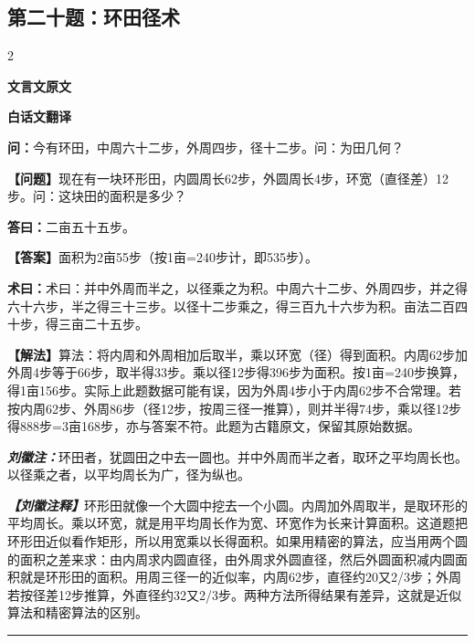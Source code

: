 \documentclass[10pt,a4paper]{article}
\newcommand{\wen}[1]{\textbf{\color{problemcolor}问：}#1\par}
\newcommand{\da}[1]{\textbf{答曰：}#1\par}
\newcommand{\shu}[1]{\textbf{术曰：}#1\par}
\newcommand{\liuhui}[1]{{\color{commentarycolor}\textit{\textbf{刘徽注：}}#1\par}}
\newcommand{\classicalheader}[1]{{\centering\large\bfseries\color{classicalcolor} #1\par\vspace{0.5em}}}
\newcommand{\wenmodern}[1]{\textbf{\color{moderncolor}【问题】}#1\par}
\newcommand{\damodern}[1]{\textbf{【答案】}#1\par}
\newcommand{\shumodern}[1]{\textbf{【解法】}#1\par}
\newcommand{\liuhuimodern}[1]{{\color{commentarycolor}\textit{\textbf{【刘徽注释】}}#1\par}}
\newcommand{\modernheader}[1]{{\centering\large\bfseries\color{moderncolor} #1\par\vspace{0.5em}}}
\newcommand{\problemsec}[1]{\subsection*{#1}}
\begin{document}
\problemsec{第二十题：环田径术}
\begin{paracol}{2}
\classicalheader{文言文原文}
\switchcolumn
\modernheader{白话文翻译}
\switchcolumn*

\wen{今有环田，中周六十二步，外周四步，径十二步。问：为田几何？}

\switchcolumn

\wenmodern{现在有一块环形田，内圆周长62步，外圆周长4步，环宽（直径差）12步。问：这块田的面积是多少？}

\switchcolumn*

\da{二亩五十五步。}

\switchcolumn

\damodern{面积为2亩55步（按1亩=240步计，即535步）。}

\switchcolumn*

\shu{术曰：并中外周而半之，以径乘之为积。中周六十二步、外周四步，并之得六十六步，半之得三十三步。以径十二步乘之，得三百九十六步为积。亩法二百四十步，得三亩二十五步。}

\switchcolumn

\shumodern{算法：将内周和外周相加后取半，乘以环宽（径）得到面积。内周62步加外周4步等于66步，取半得33步。乘以径12步得396步为面积。按1亩=240步换算，得1亩156步。实际上此题数据可能有误，因为外周4步小于内周62步不合常理。若按内周62步、外周86步（径12步，按周三径一推算），则并半得74步，乘以径12步得888步=3亩168步，亦与答案不符。此题为古籍原文，保留其原始数据。}

\switchcolumn*

\liuhui{环田者，犹圆田之中去一圆也。并中外周而半之者，取环之平均周长也。以径乘之者，以平均周长为广，径为纵也。}

\switchcolumn

\liuhuimodern{环形田就像一个大圆中挖去一个小圆。内周加外周取半，是取环形的平均周长。乘以环宽，就是用平均周长作为宽、环宽作为长来计算面积。这道题把环形田近似看作矩形，所以用宽乘以长得面积。如果用精密的算法，应当用两个圆的面积之差来求：由内周求内圆直径，由外周求外圆直径，然后外圆面积减内圆面积就是环形田的面积。用周三径一的近似率，内周62步，直径约20又2/3步；外周若按径差12步推算，外直径约32又2/3步。两种方法所得结果有差异，这就是近似算法和精密算法的区别。}

\end{paracol}

\vspace{0.3cm}
\hrule
\vspace{0.3cm}
\end{document}
